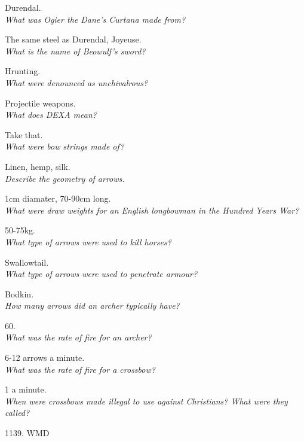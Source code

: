 \documentclass[12pt]{article}
\begin{document}
Durendal.\\

\textit{What was Ogier the Dane's Curtana made from?}

The same steel as Durendal, Joyeuse.\\

\textit{What is the name of Beowulf's sword?}

Hrunting.\\

\textit{What were denounced as unchivalrous?}

Projectile weapons.\\

\textit{What does DEXA mean?}

Take that.\\

\textit{What were bow strings made of?}

Linen, hemp, silk.\\

\textit{Describe the geometry of arrows.}

1cm diamater, 70-90cm long.\\

\textit{What were draw weights for an English longbowman in the Hundred Years War?}

50-75kg.\\


\textit{What type of arrows were used to kill horses?}

Swallowtail.\\

\textit{What type of arrows were used to penetrate armour?}

Bodkin.\\

\textit{How many arrows did an archer typically have?}

60.\\

\textit{What was the rate of fire for an archer?}

6-12 arrows a minute.\\

\textit{What was the rate of fire for a crossbow?}

1 a minute.\\

\textit{When were crossbows made illegal to use against Christians? What were they called?}

1139. WMD\\
\end{document}
